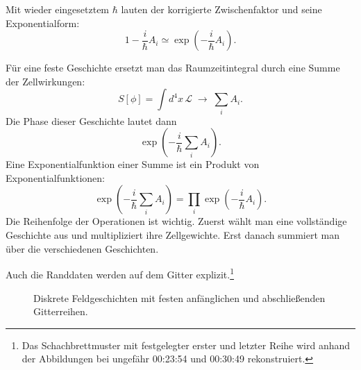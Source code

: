 \begin{classroomqa}
\end{classroomqa}

Mit wieder eingesetztem \(\hbar\) lauten der korrigierte Zwischenfaktor und seine Exponentialform:
\begin{equation}
1-\frac{i}{\hbar}A_i
\simeq
\exp\!\left(-\frac{i}{\hbar}A_i\right).
\end{equation}

Für eine feste Geschichte ersetzt man das Raumzeitintegral durch eine Summe der Zellwirkungen:
\begin{equation}
S[\phi]
=\int d^4x\,\mathcal{L}
\;\longrightarrow\;
\sum_i A_i.
\end{equation}
Die Phase dieser Geschichte lautet dann
\begin{equation}
\exp\!\left(-\frac{i}{\hbar}\sum_i A_i\right).
\end{equation}
Eine Exponentialfunktion einer Summe ist ein Produkt von Exponentialfunktionen:
\begin{equation}
\exp\!\left(-\frac{i}{\hbar}\sum_i A_i\right)
=
\prod_i\exp\!\left(-\frac{i}{\hbar}A_i\right).
\end{equation}
Die Reihenfolge der Operationen ist wichtig. Zuerst wählt man eine vollständige Geschichte aus und multipliziert ihre Zellgewichte. Erst danach summiert man über die verschiedenen Geschichten.

Auch die Randdaten werden auf dem Gitter explizit.\footnote{Das Schachbrettmuster mit festgelegter erster und letzter Reihe wird anhand der Abbildungen bei ungefähr 00:23:54 und 00:30:49 rekonstruiert.}
\begin{figure}[htbp]
\centering
{}
\caption{Diskrete Feldgeschichten mit festen anfänglichen und abschließenden Gitterreihen.}
\end{figure}

